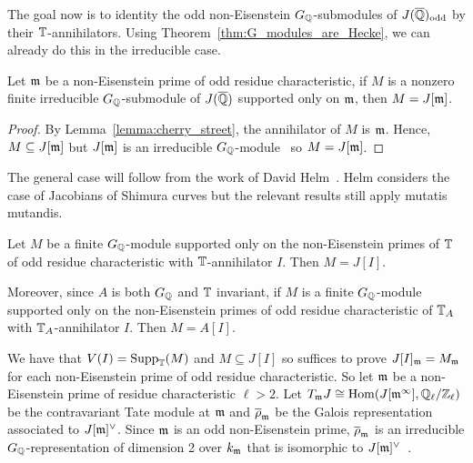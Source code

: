 \documentclass{article}
\newcommand{\odd}{\mathrm{odd}}
\begin{document}
The goal now is to identity the odd non-Eisenstein $G_{\mathbb{Q}}$-submodules of
$J(\QQbar)_\odd$ by their $\mathbb{T}$-annihilators. Using
Theorem~\ref{thm:G_modules_are_Hecke}, we can already do this in the
irreducible case.
\begin{corollary}
    Let $\mathfrak{m}$ be a non-Eisenstein prime of odd residue characteristic, if $M$ is
    a nonzero finite irreducible $G_{\mathbb{Q}}$-submodule of $J(\overline{\mathbb{Q}})$ supported
    only on $\mathfrak{m}$, then $M=J[\mathfrak{m}]$.
\end{corollary}
\begin{proof}
    By Lemma~\ref{lemma:cherry_street}, the annihilator of $M$ is $\mathfrak{m}$. Hence,
    $M\subseteq J[\mathfrak{m}]$ but $J[\mathfrak{m}]$ is an irreducible
    $G_{\mathbb{Q}}$-module~\cite[Proposition 14.2]{mazur:eisenstein} so $M=J[\mathfrak{m}]$.
\end{proof}

The general case will follow from the work of David Helm~\cite{helm:jacobian}.
Helm considers the case of Jacobians of Shimura curves but the relevant results
still apply mutatis mutandis.

\begin{theorem}%
    \label{thm:non_eisenstein_kernel_hecke}
    Let $M$ be a finite $G_{\mathbb{Q}}$-module supported only on the non-Eisenstein
    primes of $\mathbb{T}$ of odd residue characteristic with $\mathbb{T}$-annihilator $I$.
    Then $M=J[I]$.

    Moreover, since $A$ is both $G_{\mathbb{Q}}$ and $\mathbb{T}$ invariant, if $M$ is a finite
    $G_{\mathbb{Q}}$-module supported only on the non-Eisenstein primes of odd residue
    characteristic of $\mathbb{T}_A$ with $\mathbb{T}_A$-annihilator $I$. Then $M=A[I]$.
\end{theorem}

We have that $V(I)=\operatorname{Supp}_{\mathbb{T}}(M)$ and $M\subseteq J[I]$ so suffices to prove
$J[I]_{\mathfrak{m}} = M_{\mathfrak{m}}$ for each non-Eisenstein prime of odd residue characteristic.
So let $\mathfrak{m}$ be a non-Eisenstein prime of residue characteristic $\ell>2$. Let
$T_{\mathfrak{m}} J\cong \operatorname{Hom}(J[\mathfrak{m}^\infty], \mathbb{Q}_\ell/\mathbb{Z}_\ell)$ be the contravariant Tate
module at $\mathfrak{m}$ and $\overline{\rho}_{\mathfrak{m}}$ be the Galois representation associated
to $J[\mathfrak{m}]^\vee$. Since $\mathfrak{m}$ is an odd non-Eisenstein prime,
$\overline{\rho}_{\mathfrak{m}}$ is an irreducible $G_{\mathbb{Q}}$-representation of dimension 2
over $k_{\mathfrak{m}}$ that is isomorphic to $J[\mathfrak{m}]^\vee$~\cite[Prop.
14.2]{mazur:eisenstein}.
\end{document}
